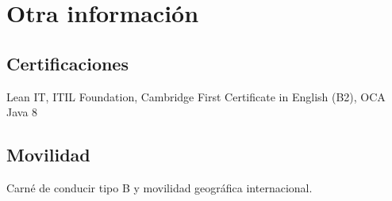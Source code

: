 \documentclass[letterpaper]{twentysecondcv} %
\begin{document}

\section{Otra información}
\subsection{Certificaciones}
Lean IT, ITIL Foundation, Cambridge First Certificate in English (B2), OCA Java 8
\subsection{Movilidad}
Carné de conducir tipo B y movilidad geográfica internacional.







\end{document}
